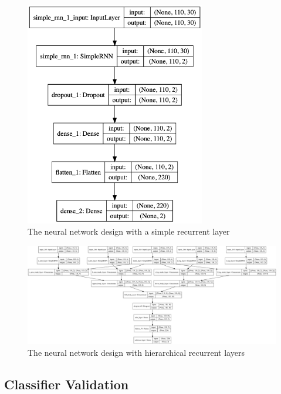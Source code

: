 \begin{figure}[htb]
  \centering
    \includegraphics[width=0.7\textwidth,keepaspectratio]
    {images/classifier/simple-rnn-network-layers}
    \caption{The neural network design with a simple recurrent layer}
    \label{simple-rnn-network-layers}
\end{figure}

\begin{figure}[htb]
  \centering
    \includegraphics[width=\textwidth,keepaspectratio]
    {images/classifier/hierarchical-rnn-model-summary}
    \caption{The neural network design with hierarchical recurrent layers}
    \label{hierarchical-rnn-network-layers}
\end{figure}

\subsection{Classifier Validation}

